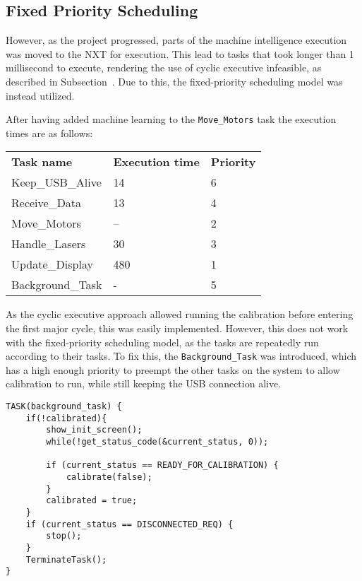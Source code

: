 \subsection{Fixed Priority Scheduling}
However, as the project progressed, parts of the machine intelligence execution was moved to the NXT for execution.
This lead to tasks that took longer than 1 millisecond to execute, rendering the use of cyclic executive infeasible, as described in Subsection~\cite{Design:Scheduling}. 
Due to this, the fixed-priority scheduling model was instead utilized. 

After having added machine learning to the \texttt{Move\_Motors} task the execution times are as follows:

\begin{table}[tbp]
\begin{tabular}{lll}
\textbf{Task name}  & \textbf{Execution time} 	& \textbf{Priority}\\
Keep\_USB\_Alive    & 14                        & 6    \\
Receive\_Data       & 13                        & 4   \\
Move\_Motors        & --                        & 2   \\
Handle\_Lasers      & 30                        & 3   \\
Update\_Display     & 480                       & 1   \\                     
Background\_Task    & -                        	& 5  \\                     
\end{tabular}
\end{table}\label{table:executionTimes}

As the cyclic executive approach allowed running the calibration before entering the first major cycle, this was easily implemented.
However, this does not work with the fixed-priority scheduling model, as the tasks are repeatedly run according to their tasks.
To fix this, the \texttt{Background\_Task} was introduced, which has a high enough priority to preempt the other tasks on the system to allow calibration to run, while still keeping the USB connection alive.

\begin{lstlisting}[language=CSharp,label={lst:backgroundTask},caption={Background task}]
TASK(background_task) {
    if(!calibrated){
        show_init_screen();
        while(!get_status_code(&current_status, 0));

        if (current_status == READY_FOR_CALIBRATION) {
            calibrate(false);
        }
        calibrated = true;
    }
    if (current_status == DISCONNECTED_REQ) {
        stop();
    }
    TerminateTask();
}
\end{lstlisting}

